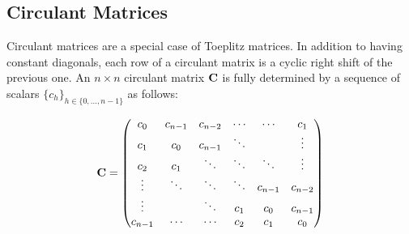 


\subsection{Circulant Matrices}
\label{subsection:ch2-circulant_matrices}

Circulant matrices are a special case of Toeplitz matrices.
In addition to having constant diagonals, each row of a circulant matrix is a cyclic right shift of the previous one.
An $n \times n$ circulant matrix $\mathbf{C}$ is fully determined by a sequence of scalars $\{c_h\}_{h \in \{0, \dots, n-1\}}$ as follows:

\begin{equation}
  \mathbf{C} =
  \begin{pmatrix}
    c_0 & c_{n-1} & c_{n-2} & \cdots & \cdots & c_{1} \\
    c_{1} & c_0 & c_{n-1} & \ddots & & \vdots \\
    c_{2} & c_{1} & \ddots & \ddots & \ddots & \vdots \\ 
    \vdots & \ddots & \ddots & \ddots & c_{n-1} & c_{n-2} \\
    \vdots & & \ddots & c_{1} & c_{0} & c_{n-1} \\
    c_{n-1} & \cdots & \cdots & c_{2} & c_{1} & c_0
  \end{pmatrix}
\end{equation}

